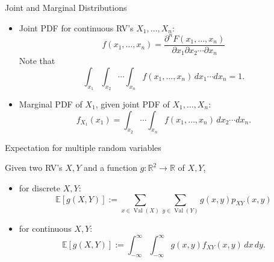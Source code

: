\documentclass[aspectratio=169,12pt]{beamer}
\DeclareMathOperator{\Val}{Val}
\begin{document}
\begin{frame}[t]{Joint and Marginal Distributions}
  \vspace{0.12cm}
  {\scriptsize
  \begin{itemize}
    \setlength{\itemsep}{0.18cm}
    \item Joint PDF for continuous RV's $X_1,\ldots,X_n$:
      \[
        f(x_1,\ldots,x_n)
        =\frac{\partial^nF(x_1,\ldots,x_n)}
        {\partial x_1\partial x_2\cdots\partial x_n}
      \]
      Note that
      \[
        \int_{x_1}\int_{x_2}\cdots\int_{x_n}
        f(x_1,\ldots,x_n)\,dx_1\cdots dx_n=1.
      \]
    \item Marginal PDF of $X_1$, given joint PDF of $X_1,\ldots,X_n$:
      \[
        f_{X_1}(x_1)
        =\int_{x_2}\cdots\int_{x_n}f(x_1,\ldots,x_n)\,dx_2\cdots dx_n.
      \]
  \end{itemize}
  }
\end{frame}

\begin{frame}[t]{Expectation for multiple random variables}
  \vspace{0.10cm}
  {\small
  Given two RV's $X,Y$ and a function $g:\mathbb{R}^2\to\mathbb{R}$ of $X,Y$,
  \begin{itemize}
    \setlength{\itemsep}{0.24cm}
    \item for discrete $X,Y$:
      \[
        \mathbb{E}[g(X,Y)]:=
        \sum_{x\in\Val(X)}\sum_{y\in\Val(Y)}g(x,y)p_{XY}(x,y)
      \]
    \item for continuous $X,Y$:
      \[
        \mathbb{E}[g(X,Y)]:=
        \int_{-\infty}^{\infty}\int_{-\infty}^{\infty}
        g(x,y)f_{XY}(x,y)\,dx\,dy.
      \]
  \end{itemize}
  }
\end{frame}
\end{document}
